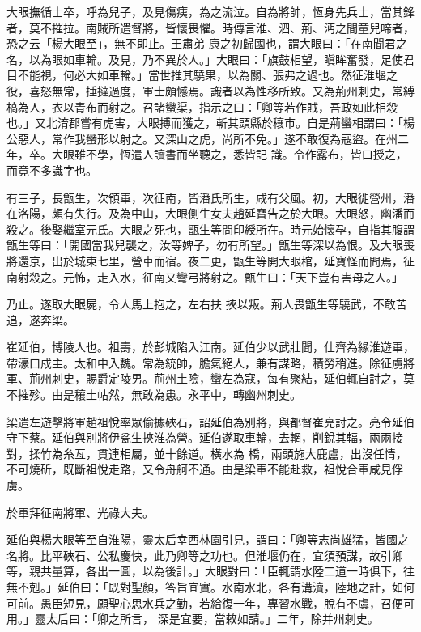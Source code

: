 \begin{pinyinscope}
 大眼撫循士卒，呼為兒子，及見傷痍，為之流泣。自為將帥，恆身先兵士，當其鋒者，莫不摧拉。南賊所遣督將，皆懷畏懼。時傳言淮、泗、荊、沔之間童兒啼者，恐之云「楊大眼至」，無不即止。王肅弟
 康之初歸國也，謂大眼曰：「在南聞君之名，以為眼如車輪。及見，乃不異於人。」大眼曰：「旗鼓相望，瞋眸奮發，足使君目不能視，何必大如車輪。」當世推其驍果，以為關、張弗之過也。然征淮堰之役，喜怒無常，捶撻過度，軍士頗憾焉。識者以為性移所致。又為荊州刺史，常縛槁為人，衣以青布而射之。召諸蠻渠，指示之曰：「卿等若作賊，吾政如此相殺也。」又北淯郡嘗有虎害，大眼搏而獲之，斬其頭縣於穰市。自是荊蠻相謂曰：「楊公惡人，常作我蠻形以射之。又深山之虎，尚所不免。」遂不敢復為寇盜。在州二年，卒。大眼雖不學，恆遣人讀書而坐聽之，悉皆記
 識。令作露布，皆口授之，而竟不多識字也。



 有三子，長甑生，次領軍，次征南，皆潘氏所生，咸有父風。初，大眼徙營州，潘在洛陽，頗有失行。及為中山，大眼側生女夫趙延寶告之於大眼。大眼怒，幽潘而殺之。後娶繼室元氏。大眼之死也，甑生等問印綬所在。時元始懷孕，自指其腹謂甑生等曰：「開國當我兒襲之，汝等婢子，勿有所望。」甑生等深以為恨。及大眼喪將還京，出於城東七里，營車而宿。夜二更，甑生等開大眼棺，延寶怪而問焉，征南射殺之。元怖，走入水，征南又彎弓將射之。甑生曰：「天下豈有害母之人。」



 乃止。遂取大眼屍，令人馬上抱之，左右扶
 挾以叛。荊人畏甑生等驍武，不敢苦追，遂奔梁。



 崔延伯，博陵人也。祖壽，於彭城陷入江南。延伯少以武壯聞，仕齊為緣淮遊軍，帶濠口戍主。太和中入魏。常為統帥，膽氣絕人，兼有謀略，積勞稍進。除征虜將軍、荊州刺史，賜爵定陵男。荊州土險，蠻左為寇，每有聚結，延伯輒自討之，莫不摧殄。由是穰土帖然，無敢為患。永平中，轉幽州刺史。



 梁遣左遊擊將軍趙祖悅率眾偷據硤石，詔延伯為別將，與都督崔亮討之。亮令延伯守下蔡。延伯與別將伊瓫生挾淮為營。延伯遂取車輪，去輞，削銳其輻，兩兩接對，揉竹為糸亙，貫連相屬，並十餘道。橫水為
 橋，兩頭施大鹿盧，出沒任情，不可燒斫，既斷祖悅走路，又令舟舸不通。由是梁軍不能赴救，祖悅合軍咸見俘虜。



 於軍拜征南將軍、光祿大夫。



 延伯與楊大眼等至自淮陽，靈太后幸西林園引見，謂曰：「卿等志尚雄猛，皆國之名將。比平硤石、公私慶快，此乃卿等之功也。但淮堰仍在，宜須預謀，故引卿等，親共量算，各出一圖，以為後計。」大眼對曰：「臣輒謂水陸二道一時俱下，往無不剋。」延伯曰：「既對聖顏，答旨宜實。水南水北，各有溝瀆，陸地之計，如何可前。愚臣短見，願聖心思水兵之勤，若給復一年，專習水戰，脫有不虞，召便可用。」靈太后曰：「卿之所言，
 深是宜要，當敕如請。」二年，除并州刺史。




\end{pinyinscope}
